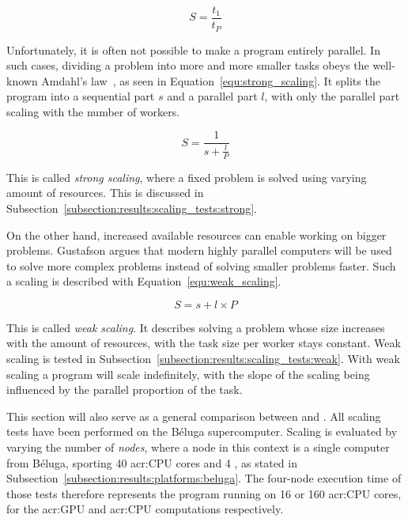 \begin{equation} \label{equ:scaling}
	S = \frac{t_1}{t_P}
\end{equation}

Unfortunately, it is often not possible to make a program entirely parallel. In such cases, dividing
a problem into more and more smaller tasks obeys the well-known Amdahl's law~\cite{Amdahl1967}, as
seen in Equation~\ref{equ:strong_scaling}. It splits the program into a sequential part \(s\) and a
parallel part \(l\), with only the parallel part scaling with the number of workers.

\begin{equation} \label{equ:strong_scaling}
	S = \frac{1}{s + \frac{l}{P}}
\end{equation}

This is called \textit{strong scaling}, where a fixed problem is solved using varying amount of
resources. This is discussed in Subsection~\ref{subsection:results:scaling_tests:strong}.

On the other hand, increased available resources can enable working on bigger problems. Gustafson
argues that modern highly parallel computers will be used to solve more complex problems instead of
solving smaller problems faster. Such a scaling is described with Equation~\ref{equ:weak_scaling}.

\begin{equation} \label{equ:weak_scaling}
	S = s + l \times P
\end{equation}

This is called \textit{weak scaling}. It describes solving a problem whose size increases with the
amount of resources, with the task size per worker stays constant. Weak scaling is tested in
Subsection~\ref{subsection:results:scaling_tests:weak}. With weak scaling a program will scale
indefinitely, with the slope of the scaling being influenced by the parallel proportion of the task.

This section will also serve as a general comparison between  and
. All scaling tests have been performed on the Béluga supercomputer. Scaling is
evaluated by varying the number of \textit{nodes}, where a node in this context is a single computer
from Béluga, sporting 40 \acrshort{acr:CPU} cores and 4 , as stated in
Subsection~\ref{subsection:results:platforms:beluga}. The four-node execution time of those tests
therefore represents the program running on 16  or 160 \acrshort{acr:CPU} cores,
for the \acrshort{acr:GPU} and \acrshort{acr:CPU} computations respectively.

